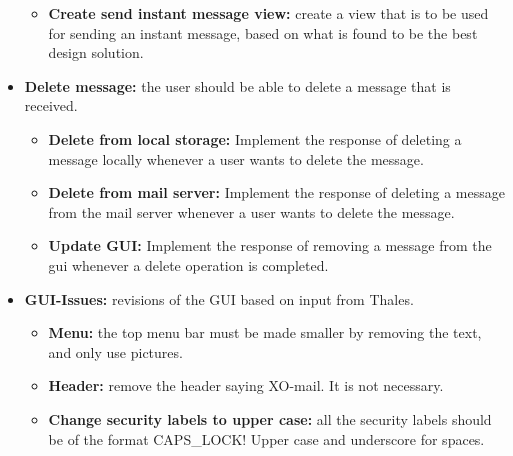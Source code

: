 \begin{itemize}
\begin{itemize}
\item{}\textbf{Create send instant message view:} create a view that is to be used for sending an instant message, based on what is found to be the best design solution.
\end{itemize}
\item{}\textbf{Delete message:} the user should be able to delete a message that is received.
\begin{itemize}
\item{}\textbf{Delete from local storage:} Implement the response of deleting a message locally whenever a user wants to delete the message.
\item{}\textbf{Delete from mail server:} Implement the response of deleting a message from the mail server whenever a user wants to delete the message.
\item{}\textbf{Update GUI:} Implement the response of removing a message from the gui whenever a delete operation is completed. 
\end{itemize}
\item{}\textbf{GUI-Issues:} revisions of the GUI based on input from Thales.
\begin{itemize}
\item{}\textbf{Menu:} the top menu bar must be made smaller by removing the text, and only use pictures.
\item{}\textbf{Header:} remove the header saying XO-mail. It is not necessary.
\item{}\textbf{Change security labels to upper case:} all the security labels should be of the format CAPS\_LOCK! Upper case and underscore for spaces.
\end{itemize}
\end{itemize}

